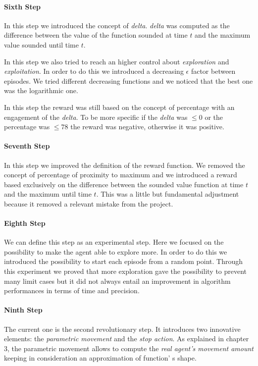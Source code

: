 \paragraph{Sixth Step} In this step we introduced the concept of \textit{delta}. \textit{delta} was computed as the difference between the value of the function sounded at time $t$ and the maximum value sounded until time $t$. 

In this step we also tried to reach an higher control about \textit{exploration} and \textit{exploitation}. In order to do this we introduced a decreasing $\epsilon$ factor between episodes. We tried different decreasing functions and we noticed that the best one was the logarithmic one. 

In this step the reward was still based on the concept of percentage with an engagement of the \textit{delta}. To be more specific if the \textit{delta} was $\le 0$ or the percentage was $\le 78$ the reward was negative, otherwise it was positive.

\paragraph{Seventh Step} In this step we improved the definition of the reward function. We removed the concept of percentage of proximity to maximum and we introduced a reward based exclusively on the difference between the sounded value function at time $t$ and the maximum until time $t$. This was a little but fundamental adjustment because it removed a relevant mistake from the project.

\paragraph{Eighth Step} We can define this step as an experimental step. Here we focused on the possibility to make the agent able to explore more. In order to do this we introduced the possibility to start each episode from a random point. Through this experiment we proved that more exploration gave the possibility to prevent many limit cases but it did not always entail an improvement in algorithm performances in terms of time and precision.

\paragraph{Ninth Step} The current one is the second revolutionary step. It introduces two innovative elements: the \textit{parametric movement} and the \textit{stop action}.
As explained in chapter $3$, the parametric movement allows to compute the \textit{real agent's movement amount} keeping in consideration an approximation of function' s shape.

